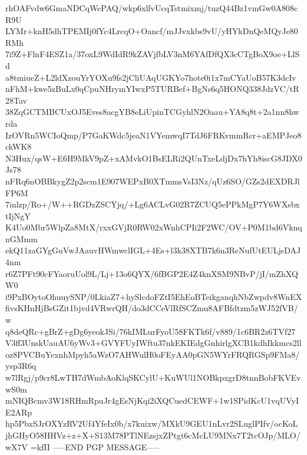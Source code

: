 rhOAFvdw6GmaNDCqWePAQ/wkp6xlfvUcqTstmixmj/tuzQ44Bz1vmGw0A808cR9U
LYMr+knH5dhTPEMIj0fYc4LrcqO+Oancf/mJJvxkbs9vU/yHYkDnQeMQyJe80RMh
7i9Z+FlnF4ESZ1a/37oxL9WdIdR9kZAVjfbLV3nM6YAfDfQX3cCTgBoX9oe+LlSd
a8tmiueZ+L2ldXzouYrYOXu9fs2jCliUAqUGKYo7hote0i1x7mCYaUoB57K3dcIv
nFhM+kwe5zBuLx0qCpuNHrymYIwxP5TURBef+BgNs6q5HONQ338JdzVC/tR28Tav
38ZqGCTMBCUxOJ5Eves8acgYB8eLiUpinTCGyhlN2Oaau+YA8q8t+2a1nn8hwrda
IzOVRn5WCIoQmp/P7GaKWdc5jeaN1VYemwqI7TdJ6FRKvmmRcr+aEMPJeo8ckWK8
N3Hux/qsW+E6H9MkV9pZ+xAMvkO1BsELRi2QUnTxeLdjDx7hYh8iscG8JDX0Js78
nFRq6nOBBkygZ2p2scm1E907WEPxB0XTmmsVsI3Nz/qUz6SO/GZs2dEXDRJlFP6M
7inlzp/Ro+/W++RGDzZSCYjq/+Lg6ACLvG02R7ZCUQ5ePPkMgP7Y6WXsbxtIjNgY
K4Uo0Mbr5WlpZa8MtX/rxxGVjR0RW02xWnhCPIi2F2WC/OV+P0M1bd6VknqnGMmm
ekQ11zaGYgGuVwJAauvHWmwclIGL+4Es+l3k38XTB7k6n3ReNufUtEULjsDAJ4nm
r6Z7PFt90cFYaoruUol9L/Lj+13o6QYX/6fBGP2E4Z4knXSM9NBvP/jI/mZhXQW0
i9PxBOytoOhuuySNP/0LkiaZ7+hySlcdoFZtI5EhEoBTeikganqhNbZwpdv8WnEX
fivsKHnHjBsGZit1bjvd4VRwrQH/do3dCCeVlRfSCZmu8AFBfdtzm5zWJ52fVB/w
q8deQRc+gBrZ+gDg6yeokJSi/76kIMLurFyoU58FKTk6f/v889/1c6BR2z6TVf27
V3ff3UnskUauAU6yWv3+GVYFUyIWftu37nkEKIEdgGnhirlgXCB1kdhIkkmcs2ll
oz8PVCBuYexnhMpyh5aWzO7AHWulH0oFEyAA0pGN5WYrFRQRGSp9FMa8/ysp3R6q
w7lRgj/p9cr8LwTH7dWmbAoKlqSKCylU+KuWUl1NOBkpxgrD8tnnBobFKVEvwS0m
mNIQBcmv3W18RHmRpuJr4gEsNjKqi2iXQCuedCEWF+1w1SPidKcU1vqUVyIE2ARp
hp5PbxSJrOXYzRV2Uf4YfeIx0b/x7kuixw/MXkU9GEU1nLvr2SLuglPIfv/ocKoL
jhGHyO58HHVz+z+X+S13M78PTlNEzsjxZPtgt6cMcLU9MNx7T2tcOJp/MLO/wX7V
=kfII
-----END PGP MESSAGE-----
